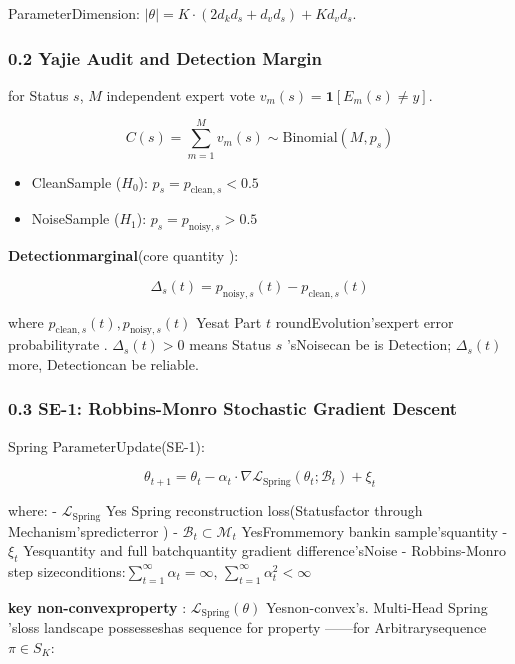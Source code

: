 \documentclass[
  12pt,
]{article}
\providecommand{\tightlist}{%
  \setlength{\itemsep}{0pt}\setlength{\parskip}{0pt}}
\begin{document}
ParameterDimension: \(|\theta| = K \cdot (2d_k d_s + d_v d_s) + K d_v d_s\). 

\subsubsection{0.2
Yajie Audit and Detection Margin}\label{ux96c5ux6d01ux5ba1ux8ba1ux4e0eux68c0ux6d4bux8fb9ux9645}

for Status \(s\), \(M\) independent expert vote
\(v_m(s) = \mathbf{1}[E_m(s) \neq y]\). 

\[C(s) = \sum_{m=1}^{M} v_m(s) \sim \text{Binomial}(M, p_s)\]

\begin{itemize}
\tightlist
\item
  CleanSample (\(H_0\)): \(p_s = p_{\text{clean},s} < 0.5\)
\item
  NoiseSample (\(H_1\)): \(p_s = p_{\text{noisy},s} > 0.5\)
\end{itemize}

\textbf{Detectionmarginal}(core quantity ):

\[\boxed{\Delta_s(t) = p_{\text{noisy},s}(t) - p_{\text{clean},s}(t)}\]

where \(p_{\text{clean},s}(t), p_{\text{noisy},s}(t)\) Yesat Part \(t\)
roundEvolution'sexpert error probabilityrate . \(\Delta_s(t) > 0\) means Status \(s\)
'sNoisecan be is Detection; \(\Delta_s(t)\) more, Detectioncan be reliable. 

\subsubsection{0.3 SE-1: Robbins-Monro
Stochastic Gradient Descent}\label{se-1-robbins-monro-ux968fux673aux68afux5ea6ux4e0bux964d}

Spring ParameterUpdate(SE-1):

\[\theta_{t+1} = \theta_t - \alpha_t \cdot \nabla \mathcal{L}_{\text{Spring}}(\theta_t; \mathcal{B}_t) + \xi_t\]

where:  - \(\mathcal{L}_{\text{Spring}}\) Yes Spring
reconstruction loss(Statusfactor through Mechanism'spredicterror ) -
\(\mathcal{B}_t \subset \mathcal{M}_t\) YesFrommemory bankin sample'squantity  -
\(\xi_t\) Yesquantity and full batchquantity gradient difference'sNoise - Robbins-Monro
step sizeconditions:\(\sum_{t=1}^{\infty} \alpha_t = \infty\), \(\sum_{t=1}^{\infty} \alpha_t^2 < \infty\)

\textbf{key non-convexproperty }: \(\mathcal{L}_{\text{Spring}}(\theta)\)
Yesnon-convex's. Multi-Head Spring 'sloss landscape possesseshas sequence for property ------for Arbitrarysequence 
\(\pi \in S_K\): 
\end{document}

